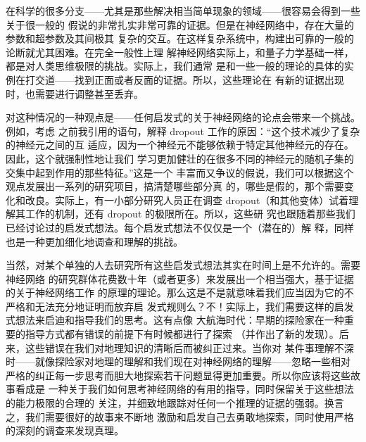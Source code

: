 在科学的很多分支——尤其是那些解决相当简单现象的领域——很容易会得到一些关于很一般的
假说的非常扎实非常可靠的证据。但是在神经网络中，存在大量的参数和超参数及其间极其
复杂的交互。在这样复杂系统中，构建出可靠的一般的论断就尤其困难。在完全一般性上理
解神经网络实际上，和量子力学基础一样，都是对人类思维极限的挑战。实际上，我们通常
是和一些一般的理论的具体的实例在打交道——找到正面或者反面的证据。所以，这些理论在
有新的证据出现时，也需要进行调整甚至丢弃。

对这种情况的一种观点是——任何启发式的关于神经网络的论点会带来一个挑战。例如，考虑
之前我引用的语句，解释 dropout 工作的原因：“这个技术减少了复杂的神经元之间的互
适应，因为一个神经元不能够依赖于特定其他神经元的存在。因此，这个就强制性地让我们
学习更加健壮的在很多不同的神经元的随机子集的交集中起到作用的那些特征。”这是一个
丰富而又争议的假说，我们可以根据这个观点发展出一系列的研究项目，搞清楚哪些部分真
的，哪些是假的，那个需要变化和改良。实际上，有一小部分研究人员正在调查
dropout（和其他变体）试着理解其工作的机制，还有 dropout 的极限所在。所以，这些研
究也跟随着那些我们已经讨论过的启发式想法。每个启发式想法不仅仅是一个（潜在的）解
释，同样也是一种更加细化地调查和理解的挑战。

当然，对某个单独的人去研究所有这些启发式想法其实在时间上是不允许的。需要神经网络
的研究群体花费数十年（或者更多）来发展出一个相当强大，基于证据的关于神经网络工作
的原理的理论。那么这是不是就意味着我们应当因为它的不严格和无法充分地证明而放弃启
发式规则么？不！实际上，我们需要这样的启发式想法来启迪和指导我们的思考。这有点像
大航海时代：早期的探险家在一种重要的指导方式都有错误的前提下有时候都进行了探索
（并作出了新的发现）。后来，这些错误在我们对地理知识的清晰后而被纠正过来。当你对
某件事理解不深时——就像探险家对地理的理解和我们现在对神经网络的理解——忽略一些相对
严格的纠正每一步思考而胆大地探索若干问题显得更加重要。所以你应该将这些故事看成是
一种关于我们如何思考神经网络的有用的指导，同时保留关于这些想法的能力极限的合理的
关注，并细致地跟踪对任何一个推理的证据的强弱。换言之，我们需要很好的故事来不断地
激励和启发自己去勇敢地探索，同时使用严格的深刻的调查来发现真理。
